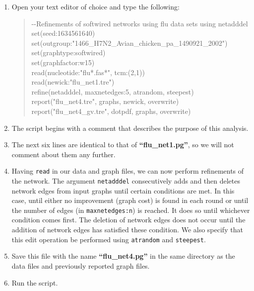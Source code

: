 \documentclass[11pt]{article}
\begin{document}
\begin {enumerate}

\item Open your text editor of choice and type the following:
	
	\begin{quote}	
	-\/-Refinements of softwired networks using flu data sets using netadddel\\
	set(seed:1634561640)\\
	set(outgroup:"1466\_H7N2\_Avian\_chicken\_pa\_1490921\_2002")\\
	set(graphtype:softwired)\\
	set(graphfactor:w15)\\ 
	read(nucleotide:"flu*.fas*", tcm:(2,1))\\
	read(newick:"flu\_net1.tre")\\
	refine(netadddel, maxnetedges:5, atrandom, steepest)\\
	report("flu\_net4.tre", graphs, newick, overwrite)\\
	report("flu\_net4\_gv.tre", dotpdf, graphs, overwrite)
	\end{quote}

\item The script begins with a comment that describes the purpose of this 
analysis.

\item The next six lines are identical to that of \textbf{``flu\_net1.pg''}, so we 
will not comment about them any further. 

\item Having \texttt{read} in our data and graph files, we can now perform 
refinements of the network. The argument \texttt{netadddel} consecutively 
adds and then deletes network edges from input graphs until certain conditions
are met. In this case, until either no improvement (graph cost) is found
in each round or until the number of edges (in \texttt{maxnetedges:n}) is reached. 
It does so until whichever condition comes first. The deletion of network edges 
does not occur until the addition of network edges has satisfied these condition.
We also specify that this edit operation be performed using \texttt{atrandom} 
and \texttt{steepest}.

\item Save this file with the name \textbf{``flu\_net4.pg''} in the same directory 
as the data files and previously reported graph files.

\item Run the script.


\end{enumerate}
\end{document}
